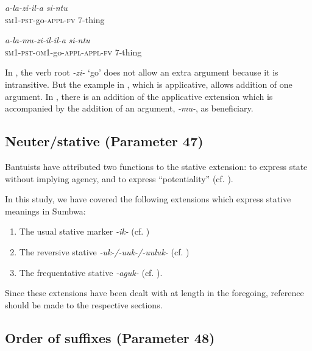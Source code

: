 \documentclass[output=paper		  ]{langscibook}
\begin{document}
    \ex\label{ex:kahigi:62b} \gll \textit{a-la-zi-il-a}               \textit{si-ntu}\\
            \textsc{sm1-pst-}go-\textsc{appl-fv}   7-thing\\

    \ex\label{ex:kahigi:62c} \gll \textit{a-la-mu-zi-il-il-a}                   \textit{si-ntu}\\
            \textsc{sm1-pst-om1-}go\textsc{-appl-appl-fv}   7-thing\\
    \z
\z

{In , the verb root} {\textit{{}-zi-}} {‘go’ does not allow an extra argument because it is intransitive. But the example in , which is applicative, allows addition of one argument. In ,} {there is an addition of the applicative extension which is accompanied by the addition of an argument,} {\textit{{}-mu-}}{, as beneficiary.}

\subsection{Neuter/stative (Parameter 47)}\label{sec:kahigi:4.12}

{Bantuists have attributed two functions to the stative extension: to express state without implying agency, and to express ``potentiality'' (cf. \citealt[227--228]{Ashton1947}).}


In this study, we have covered the following extensions which express stative meanings in Sumbwa:

\begin{enumerate}
\item {The usual stative marker} {\textit{{}-ik-}} {(cf. )}

\item {The reversive stative} {\textit{{}-uk-/-uuk-/-uuluk-}} {(cf. )}

\item {The frequentative stative} {\textit{{}-aguk-} }{(cf. ).}
\end{enumerate}


{Since these extensions have been dealt with at length in the foregoing, reference should be made to the respective sections.}

\subsection{Order of suffixes (Parameter 48)}\label{sec:kahigi:4.13}
\end{document}
